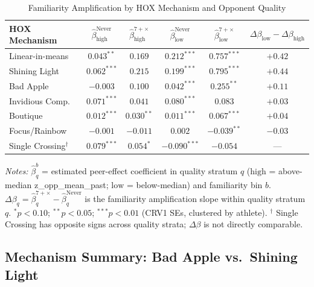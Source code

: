 \documentclass[12pt]{article}
\theoremstyle{definition}
\theoremstyle{remark}
\begin{document}
\begin{table}[H]
\centering
\begin{threeparttable}
\caption{Familiarity Amplification by HOX Mechanism and Opponent Quality}
\label{tab:amplification}
\begin{tabular}{lccccc}
\toprule
HOX Mechanism & $\hat\beta_{\text{high}}^{\text{Never}}$ & $\hat\beta_{\text{high}}^{7+\times}$
& $\hat\beta_{\text{low}}^{\text{Never}}$ & $\hat\beta_{\text{low}}^{7+\times}$
& $\Delta\beta_{\text{low}} - \Delta\beta_{\text{high}}$ \\
\midrule
Linear-in-means & $0.043^{**}$ & $0.169$        & $0.212^{***}$ & $0.757^{***}$ & $+0.42$ \\
Shining Light   & $0.062^{***}$& $0.215$        & $0.199^{***}$ & $0.795^{***}$ & $+0.44$ \\
Bad Apple       & $-0.003$     & $0.100$        & $0.042^{***}$ & $0.255^{**}$  & $+0.11$ \\
Invidious Comp. & $0.071^{***}$& $0.041$        & $0.080^{***}$ & $0.083$       & $+0.03$ \\
Boutique        & $0.012^{***}$& $0.030^{**}$   & $0.011^{***}$ & $0.067^{***}$ & $+0.04$ \\
Focus/Rainbow   & $-0.001$     & $-0.011$       & $0.002$       & $-0.039^{**}$ & $-0.03$ \\
Single Crossing$^\dagger$ & $0.079^{***}$ & $0.054^{*}$ & $-0.090^{***}$ & $-0.054$ & --- \\
\bottomrule
\end{tabular}
\begin{tablenotes}\small
\item \textit{Notes:} $\hat\beta^b_q$ = estimated peer-effect coefficient in quality stratum $q$
($\text{high}$ = above-median z\_opp\_mean\_past; $\text{low}$ = below-median) and
familiarity bin $b$.
$\Delta\beta_q = \hat\beta_q^{7+\times} - \hat\beta_q^{\text{Never}}$ is the familiarity
amplification slope within quality stratum $q$.
$^{*}p<0.10$; $^{**}p<0.05$; $^{***}p<0.01$ (CRV1 SEs, clustered by athlete).
$^\dagger$ Single Crossing has opposite signs across quality strata; $\Delta\beta$ is not
directly comparable.
\end{tablenotes}
\end{threeparttable}
\end{table}

\subsection{Mechanism Summary: Bad Apple vs.\ Shining Light}
\end{document}
